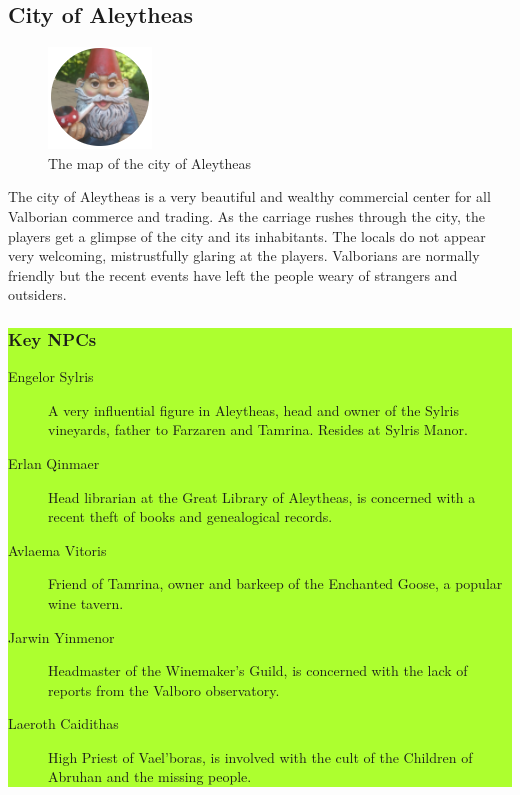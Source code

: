 \begin{multicols*}{2}
\subsection*{City of Aleytheas}

\begin{figure}
	\centering
	\includegraphics[]{images/placeholder}
	\caption{The map of the city of Aleytheas}
\end{figure}

The city of Aleytheas is a very beautiful and wealthy commercial center for all Valborian commerce and trading. As the carriage rushes through the city, the players get a glimpse of the city and its inhabitants. The locals do not appear very welcoming, mistrustfully glaring at the players. Valborians are normally friendly but the recent events have left the people weary of strangers and outsiders.
\break

\colorbox{GreenYellow}{\begin{minipage}{0.4\textwidth}
\subsubsection*{Key NPCs}
\begin{description}
	\item[Engelor Sylris] A very influential figure in Aleytheas, head and owner of the Sylris vineyards, father to Farzaren and Tamrina. Resides at Sylris Manor.
	\item[Erlan Qinmaer] Head librarian at the Great Library of Aleytheas, is concerned with a recent theft of books and genealogical records.
	\item[Avlaema Vitoris] Friend of Tamrina, owner and barkeep of the Enchanted Goose, a popular wine tavern.
	\item[Jarwin Yinmenor] Headmaster of the Winemaker's Guild, is concerned with the lack of reports from the Valboro observatory.
	\item[Laeroth Caidithas] High Priest of Vael'boras, is involved with the cult of the Children of Abruhan and the missing people.
\end{description} 
\end{minipage}}
\break


\end{multicols*}
